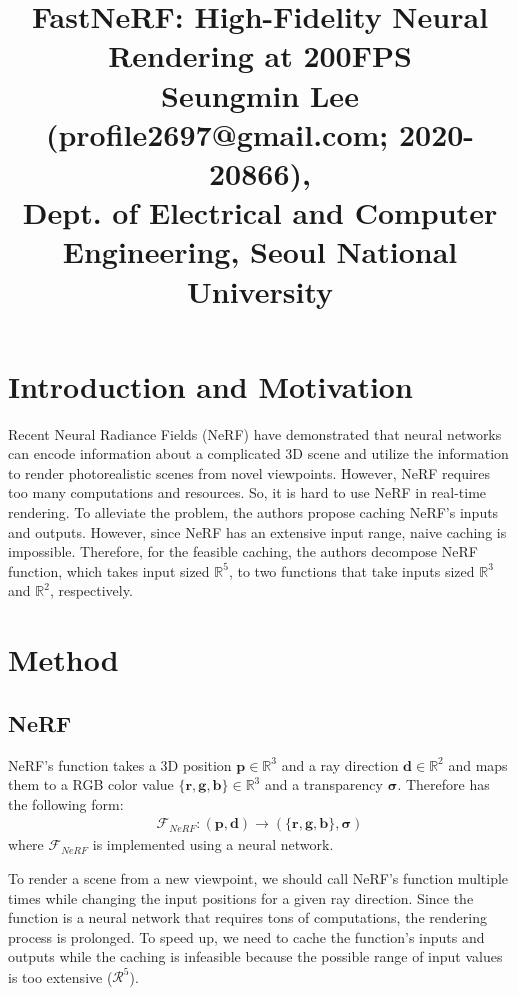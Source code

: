 \documentclass[10pt,twocolumn,letterpaper]{article}
\begin{document}
\title{FastNeRF: High-Fidelity Neural Rendering at 200FPS\\ {\rm {\normalsize Seungmin Lee (profile2697@gmail.com; 2020-20866), \\Dept. of Electrical and Computer Engineering, Seoul National University}}}   %

\maketitle
\thispagestyle{empty}

\section{Introduction and Motivation}
Recent Neural Radiance Fields (NeRF) have demonstrated that neural networks can encode information about a complicated 3D scene and utilize the information to render photorealistic scenes from novel viewpoints. However, NeRF requires too many computations and resources. So, it is hard to use NeRF in real-time rendering. To alleviate the problem, the authors propose caching NeRF's inputs and outputs. However, since NeRF has an extensive input range, naive caching is impossible. Therefore, for the feasible caching, the authors decompose NeRF function, which takes input sized $\mathbb{R}^5$, to two functions that take inputs sized $\mathbb{R}^3$ and $\mathbb{R}^2$, respectively.

\section{Method}
\subsection{NeRF}
NeRF's function takes a 3D position $\mathbf{p} \in \mathbb{R}^3$ and a ray direction $\mathbf{d} \in \mathbb{R}^2$ and maps them to a RGB color value $\{\mathbf{r}, \mathbf{g}, \mathbf{b}\} \in \mathbb{R}^3$ and a transparency $\mathbf{\sigma}$. Therefore has the following form:
\begin{align*}
	\mathcal{F}_{NeRF}: (\mathbf{p}, \mathbf{d}) \rightarrow (\{\mathbf{r}, \mathbf{g}, \mathbf{b}\}, \mathbf{\sigma})
\end{align*}
where $\mathcal{F}_{NeRF}$ is implemented using a neural network.

To render a scene from a new viewpoint, we should call NeRF's function multiple times while changing the input positions for a given ray direction. Since the function is a neural network that requires tons of computations, the rendering process is prolonged. To speed up, we need to cache the function's inputs and outputs while the caching is infeasible because the possible range of input values is too extensive ($\mathcal{R}^5$).
\end{document}
